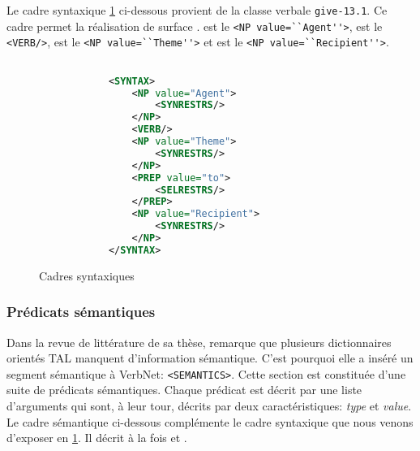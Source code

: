 Le cadre syntaxique \ref{cadresynt} ci-dessous provient de la classe verbale \texttt{give-13.1}. Ce cadre permet la réalisation de surface .  est le \lstinline{<NP value=``Agent''>},  est le \lstinline{<VERB/>},  est le \lstinline{<NP value=``Theme''>} et  est le \lstinline{<NP value=``Recipient''>}.

\begin{figure}[htb]
  \caption{Cadres syntaxiques}
	\label{cadresynt}
\begin{lstlisting}[language=Xml]

            <SYNTAX>
                <NP value="Agent">
                    <SYNRESTRS/>
                </NP>
                <VERB/>
                <NP value="Theme">
                    <SYNRESTRS/>
                </NP>
                <PREP value="to">
                    <SELRESTRS/>
                </PREP>
                <NP value="Recipient">
                    <SYNRESTRS/>
                </NP>
            </SYNTAX>
\end{lstlisting}
\end{figure}

\subsubsection{Prédicats sémantiques}
Dans la revue de littérature de sa thèse, \cite{SchulerVerbnetBroadcoverageComprehensive2005} remarque que plusieurs dictionnaires orientés \ac{TAL} manquent d'information sémantique. C'est pourquoi elle a inséré un segment sémantique à VerbNet: \lstinline{<SEMANTICS>}. Cette section est constituée d'une suite de prédicats sémantiques. Chaque prédicat est décrit par une liste d'arguments qui sont, à leur tour, décrits par deux caractéristiques: \emph{type} et \emph{value}. Le cadre sémantique ci-dessous complémente le cadre syntaxique que nous venons d'exposer en \ref{cadresynt}. Il décrit à la fois  et .

